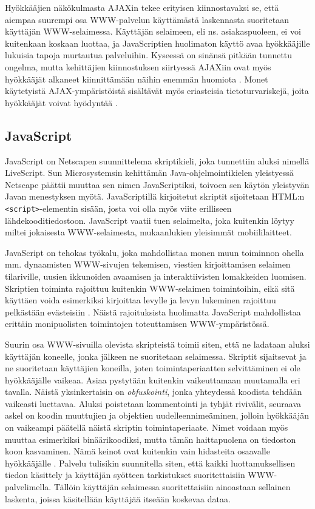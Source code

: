 Hyökkääjien näkökulmasta AJAXin tekee erityisen kiinnostavaksi se,
että aiempaa suurempi osa WWW-palvelun käyttämästä laskennasta
suoritetaan käyttäjän WWW-selaimessa. Käyttäjän selaimeen, eli
ns. asiakaspuoleen, ei voi kuitenkaan koskaan luottaa, ja
JavaScriptien huolimaton käyttö avaa hyökkääjille lukuisia tapoja
murtautua palveluihin. Kyseessä on sinänsä pitkään tunnettu ongelma,
mutta kehittäjien kiinnostuksen siirtyessä AJAXiin ovat myös
hyökkääjät alkaneet kiinnittämään näihin enemmän huomiota \cite{AJAX}.
Monet käytetyistä AJAX-ympäristöistä sisältävät myös eriasteisia
tietoturvariskejä, joita hyökkääjät voivat hyödyntää \cite{JSH}.

\subsection{JavaScript}

JavaScript on Netscapen suunnittelema skriptikieli, joka tunnettiin
aluksi nimellä LiveScript. Sun Microsystemsin kehittämän
Java-ohjelmointikielen yleistyessä Netscape päättii muuttaa sen nimen
JavaScriptiksi, toivoen sen käytön yleistyvän Javan menestyksen
myötä. JavaScriptillä kirjoitetut skriptit sijoitetaan HTML:n
\texttt{<script>}-elementin sisään, josta voi olla myös viite
erilliseen lähdekooditiedostoon. JavaScript vaatii tuen selaimelta,
joka kuitenkin löytyy miltei jokaisesta WWW-selaimesta, mukaanlukien
yleisimmät mobiililaitteet.

JavaScript on tehokas työkalu, joka mahdollistaa monen muun toiminnon
ohella mm. dynaamisten WWW-sivujen tekemisen, viestien kirjoittamisen
selaimen tilariville, uusien ikkunoiden avaamisen ja interaktiivisten
lomakkeiden luomisen. Skriptien toiminta rajoittuu kuitenkin
WWW-selaimen toimintoihin, eikä sitä käyttäen voida esimerkiksi
kirjoittaa levylle ja levyn lukeminen rajoittuu pelkästään evästeisiin
\cite{JavaScript}. Näistä rajoituksista huolimatta JavaScript
mahdollistaa erittäin monipuolisten toimintojen toteuttamisen
WWW-ympäristössä.

Suurin osa WWW-sivuilla olevista skripteistä toimii siten, että ne
ladataan aluksi käyttäjän koneelle, jonka jälkeen ne suoritetaan
selaimessa. Skriptit sijaitsevat ja ne suoritetaan käyttäjien
koneilla, joten toimintaperiaatten selvittäminen ei ole hyökkääjälle
vaikeaa. Asiaa pystytään kuitenkin vaikeuttamaan muutamalla eri
tavalla. Näistä yksinkertaisin on \emph{obfuskointi}, jonka yhteydessä
koodista tehdään vaikeasti luettavaa. Aluksi poistetaan kommentointi
ja tyhjät rivivälit, seuraava askel on koodin muuttujien ja objektien
uudelleennimeäminen, jolloin hyökkääjän on vaikeampi päätellä näistä
skriptin toimintaperiaate. Nimet voidaan myös muuttaa esimerkiksi
binäärikoodiksi, mutta tämän haittapuolena on tiedoston koon
kasvaminen. Nämä keinot ovat kuitenkin vain hidasteita osaavalle
hyökkääjälle \cite{AJAX}. Palvelu tulisikin suunnitella siten, että
kaikki luottamuksellisen tiedon käsittely ja käyttäjän syötteen
tarkistukset suoritettaisiin WWW-palvelimella. Tällöin käyttäjän
selaimessa suoritettaisiin ainoastaan sellainen laskenta, joissa
käsitellään käyttäjää itseään koskevaa dataa.

